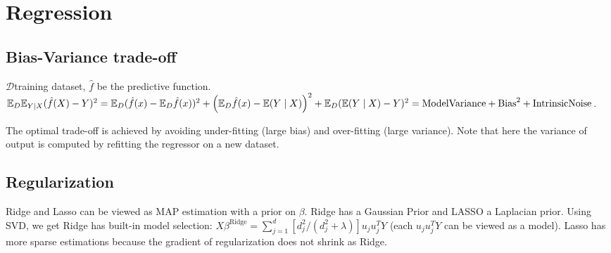 \section{Regression}

\subsection*{Bias-Variance trade-off}
$\mathcal{D}$training dataset, $\hat{f}$ be the predictive function.
$ \mathbb{E}_D \mathbb{E}_{Y\mid X} (\hat{f}(X)-Y)^2 = \mathbb{E}_D (\hat{f}(x)-\mathbb{E}_D \hat{f}(x))^2 + \left(\mathbb{E}_D \hat{f}(x)-\mathbb{E}(Y\mid X)\right)^2 + \mathbb{E}_D (\mathbb{E}(Y\mid X)-Y)^2 = \text{ModelVariance} + \text{Bias}^2 + \text{IntrinsicNoise}$. 

The optimal trade-off is achieved by avoiding under-fitting (large bias) and over-fitting (large variance). Note that here the variance of output is computed by refitting the regressor on a new dataset.

\subsection*{Regularization}

Ridge and Lasso can be viewed as MAP estimation with a prior on $\beta$. Ridge has a Gaussian Prior and LASSO a Laplacian prior. Using SVD, we get Ridge has built-in model selection:  $X\beta^{\text{Ridge}} = \sum_{j=1}^d [d_j^2 /(d_j^2+\lambda)] u_j u_j^T Y$ (each $u_j u_j^T Y$ can be viewed as a model). Lasso has more sparse estimations because the gradient of regularization does not shrink as Ridge.
